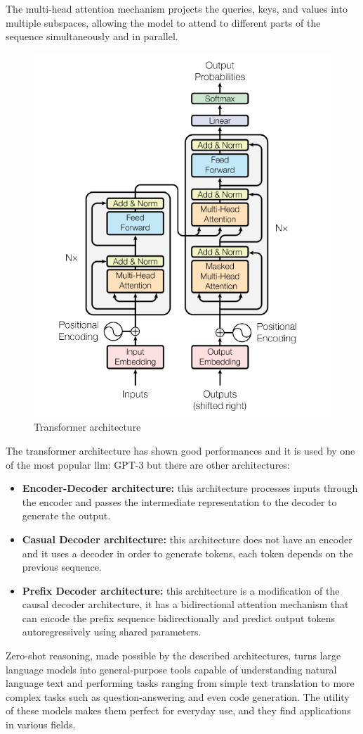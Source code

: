 The multi-head attention mechanism projects the queries, keys, and values into multiple subspaces, allowing the model to attend to different parts of the sequence simultaneously and in parallel.
\begin{figure}[H]
    \centering
    \includegraphics[width=0.5\linewidth]{Figures/fig_17.png}
    \caption{Transformer architecture}
    \label{fig:enter-label}
\end{figure}
The transformer architecture has shown good performances and it is used by one of the most popular llm: GPT-3 \cite{gpt_dugas} but there are other architectures\cite{naveed2023comprehensive}:
\begin{itemize}
    \item \textbf{Encoder-Decoder architecture:} this architecture processes inputs through the encoder and passes the intermediate representation to the decoder to generate the output.\cite{encoder_medium}

    \item \textbf{Casual Decoder architecture:} this architecture does not have an encoder and it uses a decoder in order to generate tokens, each token depends on the previous sequence. \cite{uniteai_decoder}

    \item \textbf{Prefix Decoder architecture:} this architecture is a modification of the causal decoder architecture, it has a bidirectional attention mechanism that can encode the prefix sequence bidirectionally and predict output tokens autoregressively using shared parameters. \cite{llm_labeller}
\end{itemize}
Zero-shot reasoning, made possible by the described architectures, turns large language models into general-purpose tools capable of understanding natural language text and performing tasks ranging from simple text translation to more complex tasks such as question-answering and even code generation. The utility of these models makes them perfect for everyday use, and they find applications in various fields. 


